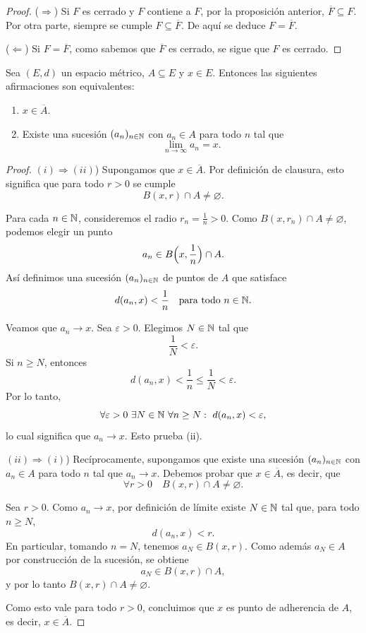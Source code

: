 \begin{proof}
($\Rightarrow$) Si $F$ es cerrado y $F$ contiene a $F$, por la proposición
anterior, $\overline{F} \subseteq F$. Por otra parte, siempre se cumple
$F \subseteq \overline{F}$. De aquí se deduce $F = \overline{F}$.

($\Leftarrow$) Si $F = \overline{F}$, como sabemos que $\overline{F}$ es
cerrado, se sigue que $F$ es cerrado.
\end{proof}

\begin{prop}
Sea $(E,d)$ un espacio métrico, $A \subseteq E$ y $x \in E$.
Entonces las siguientes afirmaciones son equivalentes:
\begin{enumerate}[label=(\roman*)]
    \item $x \in \overline{A}$.
    \item Existe una sucesión $(a_n)_{n\in\mathbb{N}}$ con $a_n \in A$ para todo $n$ tal que
    \[
    \lim_{n\to\infty} a_n = x.
    \]
\end{enumerate}
\end{prop}

\begin{proof}
$(i) \Rightarrow (ii)$) Supongamos que $x \in \overline{A}$. Por definición
de clausura, esto significa que para todo $r>0$ se cumple
\[
B(x,r) \cap A \ne \varnothing.
\]

Para cada $n \in \mathbb{N}$, consideremos el radio $r_n = \frac{1}{n} > 0$.
Como $B(x,r_n) \cap A \ne \varnothing$, podemos elegir un punto
\[
a_n \in B\Bigl(x,\frac{1}{n}\Bigr) \cap A.
\]
Así definimos una sucesión $(a_n)_{n\in\mathbb{N}}$ de puntos de $A$ que satisface
\[
d(a_n,x) < \frac{1}{n} \quad \text{para todo } n \in \mathbb{N}.
\]

Veamos que $a_n \to x$. Sea $\varepsilon > 0$. Elegimos $N \in \mathbb{N}$ tal que
\[
\frac{1}{N} < \varepsilon.
\]
Si $n \ge N$, entonces
\[
d(a_n,x) < \frac{1}{n} \le \frac{1}{N} < \varepsilon.
\]
Por lo tanto,
\[
\forall \varepsilon>0\ \exists N \in \N\ \forall n \ge N:\ d(a_n,x) < \varepsilon,
\]
lo cual significa que $a_n \to x$. Esto prueba (ii).

\medskip

$(ii) \Rightarrow (i)$) Recíprocamente, supongamos que existe una sucesión
$(a_n)_{n\in\mathbb{N}}$ con $a_n \in A$ para todo $n$ tal que $a_n \to x$.
Debemos probar que $x \in \overline{A}$, es decir, que
\[
\forall r>0 \quad B(x,r) \cap A \ne \varnothing.
\]

Sea $r>0$. Como $a_n \to x$, por definición de límite existe $N \in \mathbb{N}$
tal que, para todo $n \ge N$,
\[
d(a_n,x) < r.
\]
En particular, tomando $n = N$, tenemos $a_N \in B(x,r)$.
Como además $a_N \in A$ por construcción de la sucesión, se obtiene
\[
a_N \in B(x,r) \cap A,
\]
y por lo tanto $B(x,r) \cap A \ne \varnothing$.

Como esto vale para todo $r>0$, concluimos que $x$ es punto de adherencia
de $A$, es decir, $x \in \overline{A}$.
\end{proof}

